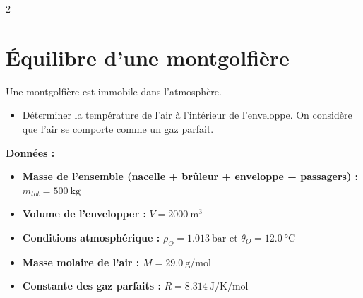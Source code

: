 \documentclass[a4paper,11pt,fleqn]{article}%
\begin{document}
\begin{multicols}{2}
\section{Équilibre d'une montgolfière}
Une montgolfière est immobile dans l'atmosphère.
\begin{itemize}
	\item Déterminer la température de l'air à l'intérieur de l'enveloppe. On considère que l'air se comporte comme un gaz parfait.
\end{itemize}
\textbf{Données :}
\begin{itemize}
	\item \textbf{Masse de l'ensemble (nacelle + brûleur + enveloppe + passagers) :} $m_{tot} = \SI{500}{\kilo\gram}$
	\item \textbf{Volume de l'envelopper :} $V=\SI{2000}{\meter\cubed}$
	\item \textbf{Conditions atmosphérique :} $\rho_O = \SI{1,013}{\bar}$ et $\theta_O = \SI{12,0}{\celsius}$
	\item \textbf{Masse molaire de l'air :} $M = \SI{29,0}{\gram\per\mole}$
	\item \textbf{Constante des gaz parfaits :} $R = \SI{8,314}{\joule\per\kelvin\per\mole}$
\end{itemize}
\end{multicols}
\end{document}
